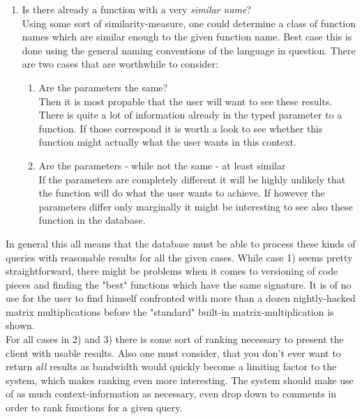 \documentclass[11p]{scrartcl}
\begin{document}
\begin{enumerate}
	\item Is there already a function with a very \emph{similar name}?\\
Using some sort of similarity-measure, one could determine a class of function names which are similar enough to the given function name. Best case this is done using the general naming conventions of the language in question. There are two cases that are worthwhile to consider:
	\begin{enumerate}
		\item Are the parameters the same?\\
Then it is most propable that the user will want to see these results. There is quite a lot of information already in the typed parameter to a function. If those correspond it is worth a look to see whether this function might actually what the user wants in this context.
		\item Are the parameters - while not the same - at least similar\\
If the parameters are completely different it will be highly unlikely that the function will do what the user wants to achieve. If however the parameters differ only marginally it might be interesting to see also these function in the database.
	\end{enumerate}
\end{enumerate}

In general this all means that the database must be able to process these kinds of queries with reasonable results for all the given cases. While case 1) seems pretty straightforward, there might be problems when it comes to versioning of code pieces and finding the "best" functions which have the same signature. It is of no use for the user to find himself confronted with more than a dozen nightly-hacked matrix multiplications before the "standard" built-in matrix-multiplication is shown. \\
For all cases in 2) and 3) there is some sort of ranking necessary to present the client with usable results. Also one must consider, that you don't ever want to return \emph{all} results as bandwidth would quickly become a limiting factor to the system, which makes ranking even more interesting.
The system should make use of as much context-information as necessary, even drop down to comments in order to rank functions for a given query.\\
\end{document}
